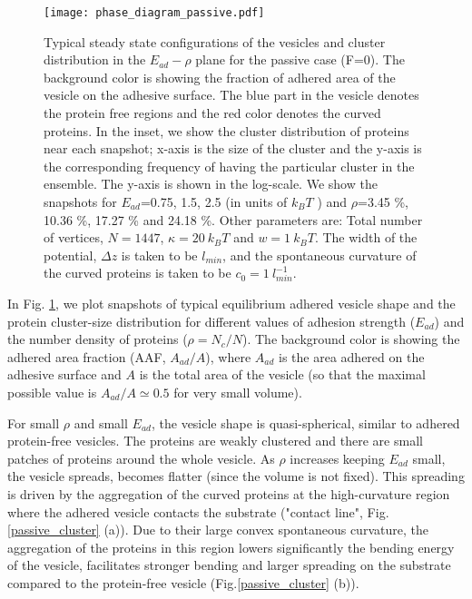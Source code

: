 \documentclass[pre,amsmath]{revtex4}
\begin{document}
\begin{figure}[ht]
\centering
\texttt{[image: phase\_diagram\_passive.pdf]}
\caption{Typical steady state configurations of the vesicles and cluster distribution in the $E_{ad}-\rho$ plane for the passive case (F=0). The background color is showing the fraction of adhered area of the vesicle on the adhesive surface. The blue part in the vesicle  denotes the protein free regions and the red color denotes the curved proteins. In the inset, we show the cluster distribution of proteins near each snapshot; x-axis is the size of the cluster and the y-axis is  the corresponding frequency of having the particular cluster in the ensemble. The y-axis is shown in the log-scale.  We show the snapshots for $E_{ad}$=0.75, 1.5, 2.5 (in units of $k_B T$ ) and $\rho$=3.45 \%, 10.36 \%, 17.27 \% and 24.18 \%. Other parameters are: Total number of vertices, $N=1447$, $\kappa =20~ k_B T$ and $w=1 ~k_BT$. The width of the potential, $\Delta z$ is taken to be $l_{min}$, and the spontaneous curvature of the curved proteins is taken to be $c_0=1~l^{-1}_{min}$.}
\label{phase_passive} 
\end{figure}

In Fig. \ref{phase_passive}, we plot snapshots of typical equilibrium adhered vesicle shape and the protein cluster-size distribution for different values of adhesion strength ($E_{ad}$) and the number density of proteins ($\rho=N_c/N$). The background color is showing the adhered area fraction (AAF, $A_{ad}/A$), where $A_{ad}$ is the area adhered on the adhesive surface and $A$ is the total area of the vesicle (so that the maximal possible value is $A_{ad}/A\simeq0.5$ for very small volume). 

For small $\rho$ and small $E_{ad}$, the vesicle shape is quasi-spherical, similar to adhered protein-free vesicles. The proteins are weakly clustered and there are small patches of proteins around the whole vesicle. As $\rho$ increases keeping $E_{ad}$ small, the vesicle spreads, becomes flatter (since the volume is not fixed). This spreading is driven by the aggregation of the curved proteins at the high-curvature region \cite{kralj_iglic1996,markin1981} where the adhered vesicle contacts the substrate ("contact line", Fig.\ref{passive_cluster} (a)). Due to their large convex spontaneous curvature, the aggregation of the proteins in this region lowers significantly the bending energy of the vesicle, facilitates stronger bending and larger spreading on the substrate compared to the protein-free vesicle (Fig.\ref{passive_cluster} (b)). 
\end{document}
